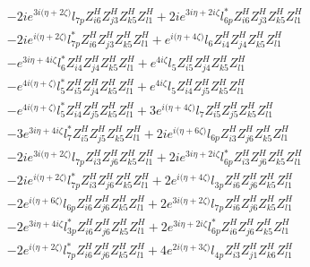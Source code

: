 \begin{align}
 &-2 i e^{3 i \Big(\eta +2 \zeta \Big)} l_{7p} Z_{{i 6}}^{H} Z_{{j 3}}^{H} Z_{{k 5}}^{H} Z_{{l 1}}^{H} +2 i e^{3 i \eta +2 i \zeta } l_{6p}^* Z_{{i 6}}^{H} Z_{{j 3}}^{H} Z_{{k 5}}^{H} Z_{{l 1}}^{H} \nonumber \\ 
 &-2 i e^{i \Big(\eta +2 \zeta \Big)} l_{7p}^* Z_{{i 6}}^{H} Z_{{j 3}}^{H} Z_{{k 5}}^{H} Z_{{l 1}}^{H} +e^{i \Big(\eta +4 \zeta \Big)} l_6 Z_{{i 4}}^{H} Z_{{j 4}}^{H} Z_{{k 5}}^{H} Z_{{l 1}}^{H} \nonumber \\ 
 &- e^{3 i \eta +4 i \zeta } l_6^* Z_{{i 4}}^{H} Z_{{j 4}}^{H} Z_{{k 5}}^{H} Z_{{l 1}}^{H} +e^{4 i \zeta } l_5 Z_{{i 5}}^{H} Z_{{j 4}}^{H} Z_{{k 5}}^{H} Z_{{l 1}}^{H} \nonumber \\ 
 &- e^{4 i \Big(\eta +\zeta \Big)} l_5^* Z_{{i 5}}^{H} Z_{{j 4}}^{H} Z_{{k 5}}^{H} Z_{{l 1}}^{H} +e^{4 i \zeta } l_5 Z_{{i 4}}^{H} Z_{{j 5}}^{H} Z_{{k 5}}^{H} Z_{{l 1}}^{H} \nonumber \\ 
 &- e^{4 i \Big(\eta +\zeta \Big)} l_5^* Z_{{i 4}}^{H} Z_{{j 5}}^{H} Z_{{k 5}}^{H} Z_{{l 1}}^{H} +3 e^{i \Big(\eta +4 \zeta \Big)} l_7 Z_{{i 5}}^{H} Z_{{j 5}}^{H} Z_{{k 5}}^{H} Z_{{l 1}}^{H} \nonumber \\ 
 &-3 e^{3 i \eta +4 i \zeta } l_7^* Z_{{i 5}}^{H} Z_{{j 5}}^{H} Z_{{k 5}}^{H} Z_{{l 1}}^{H} +2 i e^{i \Big(\eta +6 \zeta \Big)} l_{6p} Z_{{i 3}}^{H} Z_{{j 6}}^{H} Z_{{k 5}}^{H} Z_{{l 1}}^{H} \nonumber \\ 
 &-2 i e^{3 i \Big(\eta +2 \zeta \Big)} l_{7p} Z_{{i 3}}^{H} Z_{{j 6}}^{H} Z_{{k 5}}^{H} Z_{{l 1}}^{H} +2 i e^{3 i \eta +2 i \zeta } l_{6p}^* Z_{{i 3}}^{H} Z_{{j 6}}^{H} Z_{{k 5}}^{H} Z_{{l 1}}^{H} \nonumber \\ 
 &-2 i e^{i \Big(\eta +2 \zeta \Big)} l_{7p}^* Z_{{i 3}}^{H} Z_{{j 6}}^{H} Z_{{k 5}}^{H} Z_{{l 1}}^{H} +2 e^{i \Big(\eta +4 \zeta \Big)} l_{3p} Z_{{i 6}}^{H} Z_{{j 6}}^{H} Z_{{k 5}}^{H} Z_{{l 1}}^{H} \nonumber \\ 
 &-2 e^{i \Big(\eta +6 \zeta \Big)} l_{6p} Z_{{i 6}}^{H} Z_{{j 6}}^{H} Z_{{k 5}}^{H} Z_{{l 1}}^{H} +2 e^{3 i \Big(\eta +2 \zeta \Big)} l_{7p} Z_{{i 6}}^{H} Z_{{j 6}}^{H} Z_{{k 5}}^{H} Z_{{l 1}}^{H} \nonumber \\ 
 &-2 e^{3 i \eta +4 i \zeta } l_{3p}^* Z_{{i 6}}^{H} Z_{{j 6}}^{H} Z_{{k 5}}^{H} Z_{{l 1}}^{H} +2 e^{3 i \eta +2 i \zeta } l_{6p}^* Z_{{i 6}}^{H} Z_{{j 6}}^{H} Z_{{k 5}}^{H} Z_{{l 1}}^{H} \nonumber \\ 
 &-2 e^{i \Big(\eta +2 \zeta \Big)} l_{7p}^* Z_{{i 6}}^{H} Z_{{j 6}}^{H} Z_{{k 5}}^{H} Z_{{l 1}}^{H} +4 e^{2 i \Big(\eta +3 \zeta \Big)} l_{4p} Z_{{i 3}}^{H} Z_{{j 1}}^{H} Z_{{k 6}}^{H} Z_{{l 1}}^{H} \nonumber \\ 

\end{align}
